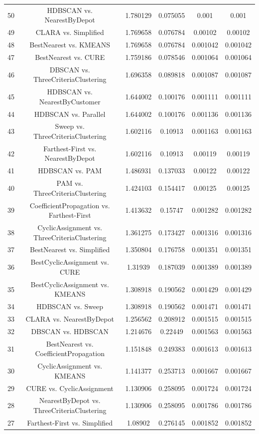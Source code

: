 \documentclass[a4paper,10pt]{article}
\begin{document}
\begin{landscape}
\begin{table}[!htp]
\begin{tabular}{cccccc}
50&HDBSCAN vs. NearestByDepot&1.780129&0.075055&0.001&0.001\\
49&CLARA vs. Simplified&1.769658&0.076784&0.00102&0.00102\\
48&BestNearest vs. KMEANS&1.769658&0.076784&0.001042&0.001042\\
47&BestNearest vs. CURE&1.759186&0.078546&0.001064&0.001064\\
46&DBSCAN vs. ThreeCriteriaClustering&1.696358&0.089818&0.001087&0.001087\\
45&HDBSCAN vs. NearestByCustomer&1.644002&0.100176&0.001111&0.001111\\
44&HDBSCAN vs. Parallel&1.644002&0.100176&0.001136&0.001136\\
43&Sweep vs. ThreeCriteriaClustering&1.602116&0.10913&0.001163&0.001163\\
42&Farthest-First vs. NearestByDepot&1.602116&0.10913&0.00119&0.00119\\
41&HDBSCAN vs. PAM&1.486931&0.137033&0.00122&0.00122\\
40&PAM vs. ThreeCriteriaClustering&1.424103&0.154417&0.00125&0.00125\\
39&CoefficientPropagation vs. Farthest-First&1.413632&0.15747&0.001282&0.001282\\
38&CyclicAssignment vs. ThreeCriteriaClustering&1.361275&0.173427&0.001316&0.001316\\
37&BestNearest vs. Simplified&1.350804&0.176758&0.001351&0.001351\\
36&BestCyclicAssignment vs. CURE&1.31939&0.187039&0.001389&0.001389\\
35&BestCyclicAssignment vs. KMEANS&1.308918&0.190562&0.001429&0.001429\\
34&HDBSCAN vs. Sweep&1.308918&0.190562&0.001471&0.001471\\
33&CLARA vs. NearestByDepot&1.256562&0.208912&0.001515&0.001515\\
32&DBSCAN vs. HDBSCAN&1.214676&0.22449&0.001563&0.001563\\
31&BestNearest vs. CoefficientPropagation&1.151848&0.249383&0.001613&0.001613\\
30&CyclicAssignment vs. KMEANS&1.141377&0.253713&0.001667&0.001667\\
29&CURE vs. CyclicAssignment&1.130906&0.258095&0.001724&0.001724\\
28&NearestByDepot vs. ThreeCriteriaClustering&1.130906&0.258095&0.001786&0.001786\\
27&Farthest-First vs. Simplified&1.08902&0.276145&0.001852&0.001852\\

\end{tabular}
\end{table}
\end{landscape}
\end{document}
